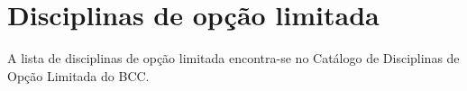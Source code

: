 \section{Disciplinas de opção limitada}
\label{sec:disciplinas_ol}

A lista de disciplinas de opção limitada encontra-se no Catálogo de Disciplinas
de Opção Limitada do BCC.
